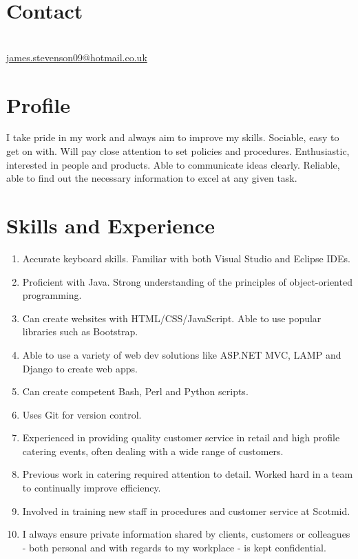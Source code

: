 \documentclass[12pt, a4paper]{article}
\begin{document}
\par{\bigskip\par}

\section{Contact}

\large{}\\
\href{mailto:james.stevenson09@hotmail.co.uk}{james.stevenson09@hotmail.co.uk}


\section{Profile}

\large{I take pride in my work and always aim to improve my skills.  
Sociable, easy to get on with.
Will pay close attention to set policies and procedures. 
Enthusiastic, interested in people and products. 
Able to communicate ideas clearly. 
Reliable, able to find out the necessary information to excel at any given task.}

\section{Skills and Experience}


\begin{enumerate}
	\item Accurate keyboard skills. Familiar with both Visual Studio and Eclipse IDEs.
	\item Proficient with Java. Strong understanding of the principles of object-oriented programming. 
	\item Can create websites with HTML/CSS/JavaScript. Able to use popular libraries such as Bootstrap.
	\item Able to use a variety of web dev solutions like ASP.NET MVC, LAMP and Django to create web apps.
        \item Can create competent Bash, Perl and Python scripts.
	\item Uses Git for version control.
	\item Experienced in providing quality customer service in retail and high profile catering events, often dealing with a wide range of customers.
	\item Previous work in catering required attention to detail. Worked hard in a team to continually improve efficiency.
	\item Involved in training new staff in procedures and customer service at Scotmid.
	\item I always ensure private information shared by clients, customers or colleagues - both personal and with regards to my workplace - is kept confidential.
\end{enumerate}
\end{document}
